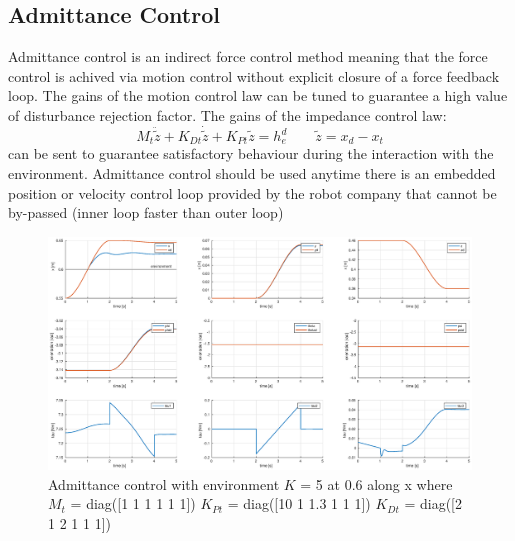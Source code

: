 \documentclass[a4paper,12pt]{article}
\begin{document}
\newpage
\subsection{Admittance Control}
Admittance control is an indirect force control method meaning that the force control is achived via motion control without explicit closure of a force feedback loop. The gains of the motion control law can be tuned to guarantee a high value of disturbance rejection factor. The gains of the impedance control law:
\[
    M_t\ddot{\tilde{z}} + K_{Dt}\dot{\tilde{z}} + K_{Pt}\tilde{z} = h_e^d \qquad \tilde{z} = x_d - x_t
\]
can be sent to guarantee satisfactory behaviour during the interaction with the environment. Admittance control should be used anytime there is an embedded position or velocity control loop provided by the robot company that cannot be by-passed (inner loop faster than outer loop)
\begin{figure}[H]
    \begin{center}
        \hspace*{-4.5cm}
        \includegraphics[scale=0.5]{images/admittance_soft.eps}
    \end{center}
    \caption{Admittance control with environment $K$ = 5 at 0.6 along x 
    where $M_t$ = diag([1 1 1 1 1 1]) $K_{Pt}$ = diag([10 1 1.3 1 1 1]) $K_{Dt}$ = diag([2 1 2 1 1 1])}
    \label{fig:admittance_soft}
\end{figure}
\end{document}
